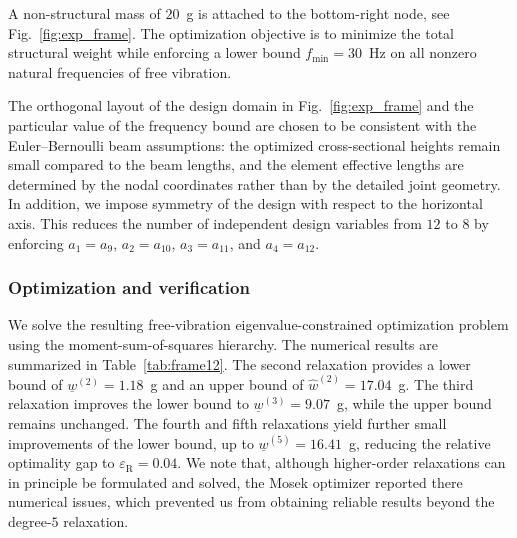 \documentclass[preprint,3p]{elsarticle}
\numberwithin{equation}{section}
\begin{document}
A non-structural mass of $20$~g is attached to the bottom-right node, see Fig.~\ref{fig:exp_frame}. The optimization objective is to minimize the total structural weight while enforcing a lower bound $f_\text{min} = 30$~Hz on all nonzero natural frequencies of free vibration.

The orthogonal layout of the design domain in Fig.~\ref{fig:exp_frame} and the particular value of the frequency bound are chosen to be consistent with the Euler--Bernoulli beam assumptions: the optimized cross-sectional heights remain small compared to the beam lengths, and the element effective lengths are determined by the nodal coordinates rather than by the detailed joint geometry. In addition, we impose symmetry of the design with respect to the horizontal axis. This reduces the number of independent design variables from $12$ to $8$ by enforcing $a_1 = a_9$, $a_2 = a_{10}$, $a_3 = a_{11}$, and $a_4 = a_{12}$.

\subsubsection{Optimization and verification}

We solve the resulting free-vibration eigenvalue-constrained optimization problem using the moment-sum-of-squares hierarchy. The numerical results are summarized in Table~\ref{tab:frame12}. The second relaxation provides a lower bound of $\underline{w}^{(2)} = 1.18$~g and an upper bound of $\hat{w}^{(2)} = 17.04$~g. The third relaxation improves the lower bound to $\underline{w}^{(3)} = 9.07$~g, while the upper bound remains unchanged. The fourth and fifth relaxations yield further small improvements of the lower bound, up to $\underline{w}^{(5)} = 16.41$~g, reducing the relative optimality gap to $\varepsilon_\mathrm{R} = 0.04$. We note that, although higher-order relaxations can in principle be formulated and solved, the Mosek optimizer reported there numerical issues, which prevented us from obtaining reliable results beyond the degree-$5$ relaxation.
\end{document}
